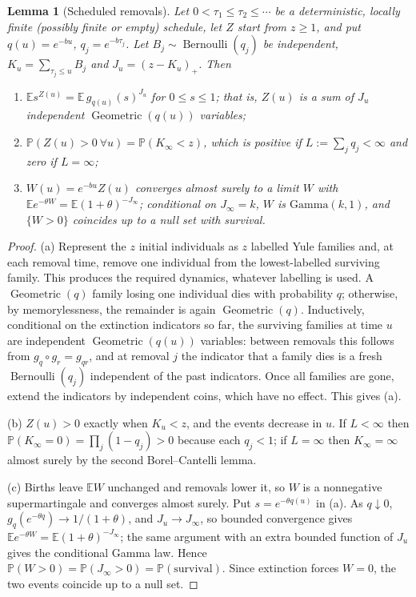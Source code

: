\documentclass[11pt,a4paper]{article}
\numberwithin{equation}{section}
\newtheorem{lemma}[theorem]{Lemma}
\theoremstyle{definition}\newtheorem{definition}[theorem]{Definition}
\theoremstyle{remark}\newtheorem{remark}[theorem]{Remark}\newtheorem{example}[theorem]{Example}
\newcommand{\E}{\mathbb E}
\renewcommand{\P}{\mathbb P}
\newcommand{\Ber}{\operatorname{Bernoulli}}
\newcommand{\Geo}{\operatorname{Geometric}}
\begin{document}
\begin{lemma}[Scheduled removals]\label{lem:sched}
Let $0<\tau_1\le\tau_2\le\cdots$ be a deterministic, locally finite (possibly finite or empty) schedule, let $Z$ start from $z\ge1$, and put $q(u)=e^{-bu}$, $q_j=e^{-b\tau_j}$. Let $B_j\sim\Ber(q_j)$ be independent, $K_u=\sum_{\tau_j\le u}B_j$ and $J_u=(z-K_u)_+$. Then
\begin{enumerate}[label=(\alph*)]
\item $\E s^{Z(u)}=\E\,g_{q(u)}(s)^{J_u}$ for $0\le s\le1$; that is, $Z(u)$ is a sum of $J_u$ independent $\Geo(q(u))$ variables;
\item $\P(Z(u)>0\ \forall u)=\P(K_\infty<z)$, which is positive if $L:=\sum_jq_j<\infty$ and zero if $L=\infty$;
\item $W(u)=e^{-bu}Z(u)$ converges almost surely to a limit $W$ with $\E e^{-\theta W}=\E(1+\theta)^{-J_\infty}$; conditional on $J_\infty=k$, $W$ is $\mathrm{Gamma}(k,1)$, and $\{W>0\}$ coincides up to a null set with survival.
\end{enumerate}
\end{lemma}

\begin{proof}
(a) Represent the $z$ initial individuals as $z$ labelled Yule families and, at each removal time, remove one individual from the lowest-labelled surviving family. This produces the required dynamics, whatever labelling is used. A $\Geo(q)$ family losing one individual dies with probability $q$; otherwise, by memorylessness, the remainder is again $\Geo(q)$. Inductively, conditional on the extinction indicators so far, the surviving families at time $u$ are independent $\Geo(q(u))$ variables: between removals this follows from $g_q\circ g_r=g_{qr}$, and at removal $j$ the indicator that a family dies is a fresh $\Ber(q_j)$ independent of the past indicators. Once all families are gone, extend the indicators by independent coins, which have no effect. This gives (a).

(b) $Z(u)>0$ exactly when $K_u<z$, and the events decrease in $u$. If $L<\infty$ then $\P(K_\infty=0)=\prod_j(1-q_j)>0$ because each $q_j<1$; if $L=\infty$ then $K_\infty=\infty$ almost surely by the second Borel--Cantelli lemma.

(c) Births leave $\E W$ unchanged and removals lower it, so $W$ is a nonnegative supermartingale and converges almost surely. Put $s=e^{-\theta q(u)}$ in (a). As $q\downarrow0$, $g_q(e^{-\theta q})\to1/(1+\theta)$, and $J_u\to J_\infty$, so bounded convergence gives $\E e^{-\theta W}=\E(1+\theta)^{-J_\infty}$; the same argument with an extra bounded function of $J_u$ gives the conditional Gamma law. Hence $\P(W>0)=\P(J_\infty>0)=\P(\text{survival})$. Since extinction forces $W=0$, the two events coincide up to a null set.
\end{proof}
\end{document}

